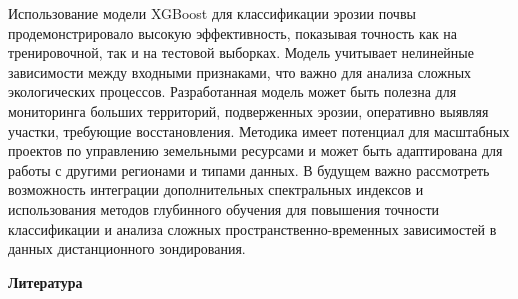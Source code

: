 \begin{multicols}{2}
Использование модели XGBoost для классификации эрозии почвы
продемонстрировало высокую эффективность, показывая точность как на
тренировочной, так и на тестовой выборках. Модель учитывает нелинейные
зависимости между входными признаками, что важно для анализа сложных
экологических процессов. Разработанная модель может быть полезна для
мониторинга больших территорий, подверженных эрозии, оперативно выявляя
участки, требующие восстановления. Методика имеет потенциал для
масштабных проектов по управлению земельными ресурсами и может быть
адаптирована для работы с другими регионами и типами данных. В будущем
важно рассмотреть возможность интеграции дополнительных спектральных
индексов и использования методов глубинного обучения для повышения
точности классификации и анализа сложных пространственно-временных
зависимостей в данных дистанционного зондирования.
\end{multicols}

\begin{center}
{\bfseries Литература}
\end{center}

